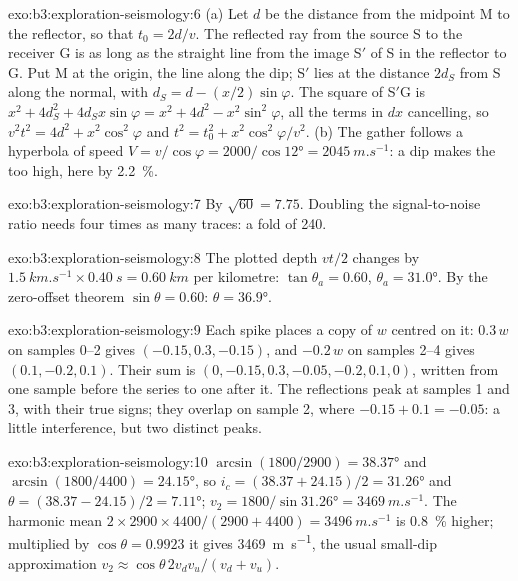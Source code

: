 \begin{solution}{exo:b3:exploration-seismology:6}
(a) Let $d$ be the distance from the midpoint M to the reflector, so that
$t_0 = 2d/v$. The reflected ray from the source S to the receiver G is as long
as the straight line from the image S$'$ of S in the reflector to G. Put M at
the origin, the line along the dip; S$'$ lies at the distance $2d_S$ from S along
the normal, with $d_S = d - (x/2)\sin\varphi$. The square of S$'$G is
$x^2 + 4d_S^2 + 4d_Sx\sin\varphi = x^2 + 4d^2 - x^2\sin^2\varphi$, all the terms
in $dx$ cancelling, so $v^2t^2 = 4d^2 + x^2\cos^2\varphi$ and
$t^2 = t_0^2 + x^2\cos^2\varphi/v^2$. (b) The gather follows a hyperbola of speed
$V = v/\cos\varphi = 2000/\cos\ang{12} = \qty{2045}{m.s^{-1}}$: a dip makes the
 too high, here by \qty{2.2}{\percent}.
\end{solution}

\begin{solution}{exo:b3:exploration-seismology:7}
By $\sqrt{60} = 7.75$. Doubling the signal-to-noise ratio needs four times as
many traces: a fold of 240.
\end{solution}

\begin{solution}{exo:b3:exploration-seismology:8}
The plotted depth $vt/2$ changes by $\qty{1.5}{km.s^{-1}}\times\qty{0.40}{s}
= \qty{0.60}{km}$ per kilometre: $\tan\theta_a = 0.60$, $\theta_a = \ang{31.0}$.
By the zero-offset theorem $\sin\theta = 0.60$: $\theta = \ang{36.9}$.
\end{solution}

\begin{solution}{exo:b3:exploration-seismology:9}
Each spike places a copy of $w$ centred on it: $0.3\,w$ on samples 0--2 gives
$(-0.15, 0.3, -0.15)$, and $-0.2\,w$ on samples 2--4 gives $(0.1, -0.2, 0.1)$.
Their sum is $(0, -0.15, 0.3, -0.05, -0.2, 0.1, 0)$, written from one sample
before the series to one after it. The reflections peak at samples 1 and 3, with
their true signs; they overlap on sample 2, where $-0.15 + 0.1 = -0.05$: a
little interference, but two distinct peaks.
\end{solution}

\begin{solution}{exo:b3:exploration-seismology:10}
$\arcsin(1800/2900) = \ang{38.37}$ and $\arcsin(1800/4400) = \ang{24.15}$, so
$i_c = (38.37 + 24.15)/2 = \ang{31.26}$ and $\theta = (38.37 - 24.15)/2 =
\ang{7.11}$; $v_2 = 1800/\sin\ang{31.26} = \qty{3469}{m.s^{-1}}$. The harmonic
mean $2\times2900\times4400/(2900 + 4400) = \qty{3496}{m.s^{-1}}$ is
\qty{0.8}{\percent} higher; multiplied by $\cos\theta = 0.9923$ it gives
\qty{3469}{m.s^{-1}}, the usual small-dip approximation
$v_2 \approx \cos\theta\,2v_dv_u/(v_d + v_u)$.
\end{solution}

